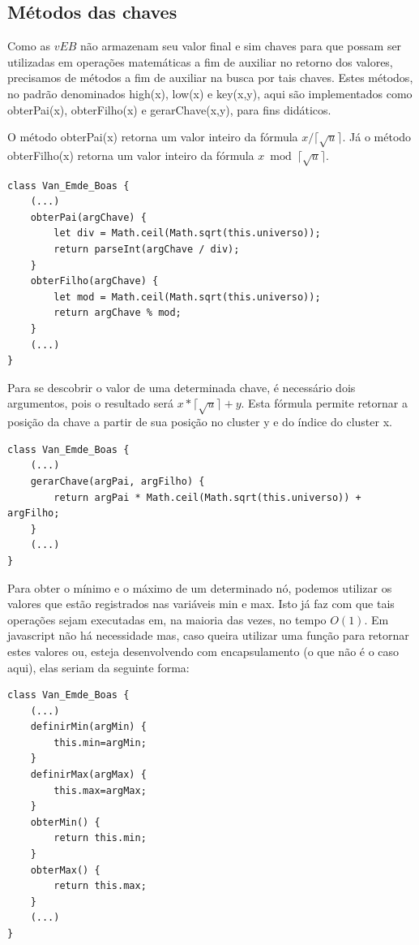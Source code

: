 \documentclass[12pt]{article}
\begin{document}
\subsection{Métodos das chaves}
Como as $vEB$ não armazenam seu valor final e sim chaves para que possam ser utilizadas em operações matemáticas a fim de auxiliar no retorno dos valores, precisamos de métodos a fim de auxiliar na busca por tais chaves. Estes métodos, no padrão denominados high(x), low(x) e key(x,y), aqui são implementados como obterPai(x), obterFilho(x) e gerarChave(x,y), para fins didáticos.

O método obterPai(x) retorna um valor inteiro da fórmula $x / \lceil \sqrt{u} \rceil$. Já o método obterFilho(x) retorna um valor inteiro da fórmula $x \bmod{\lceil \sqrt{u} \rceil}$.
\begin{verbatim}
class Van_Emde_Boas {
    (...)
    obterPai(argChave) {
        let div = Math.ceil(Math.sqrt(this.universo));
        return parseInt(argChave / div);
    }
    obterFilho(argChave) {
        let mod = Math.ceil(Math.sqrt(this.universo));
        return argChave % mod;
    }
    (...)
}
\end{verbatim}

Para se descobrir o valor de uma determinada chave, é necessário dois argumentos, pois o resultado será $x * \lceil \sqrt{u} \rceil + y$. Esta fórmula permite retornar a posição da chave a partir de sua posição no cluster y e do índice do cluster x.
\begin{verbatim}
class Van_Emde_Boas {
    (...)
    gerarChave(argPai, argFilho) {
        return argPai * Math.ceil(Math.sqrt(this.universo)) + argFilho;
    }
    (...)
}
\end{verbatim}

Para obter o mínimo e o máximo de um determinado nó, podemos utilizar os valores que estão registrados nas variáveis min e max. Isto já faz com que tais operações sejam executadas em, na maioria das vezes, no tempo $O(1)$. Em javascript não há necessidade mas, caso queira utilizar uma função para retornar estes valores ou, esteja desenvolvendo com encapsulamento (o que não é o caso aqui), elas seriam da seguinte forma:
\begin{verbatim}
class Van_Emde_Boas {
    (...)
    definirMin(argMin) {
        this.min=argMin;
    }
    definirMax(argMax) {
        this.max=argMax;
    }
    obterMin() {
        return this.min;
    }
    obterMax() {
        return this.max;
    }
    (...)
}
\end{verbatim}
\end{document}
